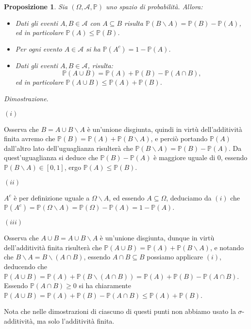 \documentclass[11pt]{book}
\makeatletter
\theoremstyle{Definizione}
\theoremstyle{TeoremaProposizioneLemmaCorollario}
\newtheorem{mypropo}[myteo]{Proposizione}
\theoremstyle{OsservazioneNota}
\renewenvironment{proof}[1][\proofname]{\par
  \normalfont \topsep6\p@\@plus6\p@\relax
  \trivlist
  \item[\hskip\labelsep
        \itshape
    #1\@addpunct{.}]\ignorespaces
}{%
  \endtrivlist\@endpefalse
}
\newcommand{\tolto}{\smallsetminus}
\renewcommand{\P}{\mathbb{P}}
\renewenvironment{proof}{\textsl{Dimostrazione}.}{}
\makeatother
\begin{document}
\begin{boxpro}
\begin{mypropo}\label{pro:ProprietàSempliciProbabilità}
Sia $(\Omega,\mathcal{A},\P)$ uno spazio di probabilità. Allora:
\begin{itemize}
\item[$(i)$] Dati gli eventi $A,B\in \mathcal{A}$ con $A\subseteq B$ risulta $\P(B\tolto A) = \P(B)-\P(A)$, ed in particolare $\P(A)\leq \P(B)$.
\item[$(ii)$] Per ogni evento $A\in \mathcal{A}$ si ha $\P(A^c) = 1-\P(A)$.
\item[$(iii)$] Dati gli eventi $A,B\in \mathcal{A}$, risulta:
$$
\P(A\cup B) = \P(A)+\P(B) - \P(A\cap B),
$$
ed in particolare $\P(A\cup B) \leq \P(A) + \P(B)$.
\end{itemize}
\end{mypropo}
\tcblower
\begin{proof}
\hfill
\begin{flushleft}
$(i)$
\end{flushleft}
Osserva che $B = A \cup B\tolto A$ è un'unione disgiunta, quindi in virtù dell'additività finita avremo che $\P(B) = \P(A)+ \P(B\tolto A)$, e perciò portando $\P(A)$ dall'altro lato dell'uguaglianza risulterà che $\P(B\tolto A) = \P(B) - \P(A)$. Da quest'uguaglianza si deduce che $\P(B) - \P(A)$ è maggiore uguale di $0$, essendo $\P(B\tolto A) \in [0,1]$, ergo $\P(A)\leq \P(B)$.
\begin{flushleft}
$(ii)$
\end{flushleft}
$A^c$ è per definizione uguale a $\Omega \tolto A$, ed essendo $A\subseteq \Omega$, deduciamo da $(i)$ che $\P(A^c) =  \P(\Omega\tolto A) = \P(\Omega) - \P(A) = 1-\P(A)$.
\begin{flushleft}
$(iii)$
\end{flushleft}
Osserva che $A\cup B = A \cup B \tolto A$ è un'unione disgiunta, dunque in virtù dell'additività finita risulterà che $\P(A\cup B) = \P(A) + \P(B\tolto A)$, e notando che $B \tolto A = B \tolto (A\cap B)$, essendo $A\cap B \subseteq B$ possiamo applicare $(i)$, deducendo che $\P(A\cup B) = \P(A) + \P(B\tolto(A\cap B)) = \P(A)+ \P(B) - \P(A\cap B)$.\\
Essendo $\P(A\cap B) \geq 0$ si ha chiaramente $\P(A\cup B) = \P(A) + \P(B) - \P(A\cap B) \leq \P(A) + \P(B)$.
\end{proof}
\end{boxpro}
\noindent 
Nota che nelle dimostrazioni di ciascuno di questi punti non abbiamo usato la $\sigma$-additività, ma solo l'additività finita.
\end{document}
